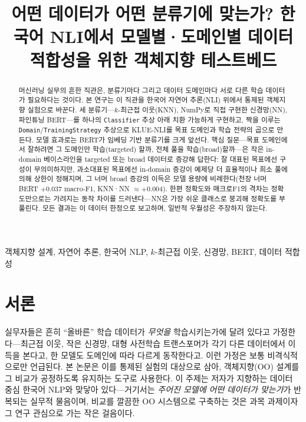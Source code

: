 \documentclass[conference]{IEEEtran}
\begin{document}
\title{어떤 데이터가 어떤 분류기에 맞는가? 한국어 NLI에서 모델별·도메인별
데이터 적합성을 위한 객체지향 테스트베드}

\author{
}

\maketitle

\begin{abstract}
머신러닝 실무의 흔한 직관은, 분류기마다 그리고 데이터 도메인마다 서로
다른 학습 데이터가 필요하다는 것이다. 본 연구는 이 직관을 한국어 자연어
추론(NLI) 위에서 통제된 객체지향 실험으로 바꾼다. 세 분류기---$k$-최근접
이웃(KNN), NumPy로 직접 구현한 신경망(NN), 파인튜닝 BERT---를 하나의
\texttt{Classifier} 추상 아래 치환 가능하게 구현하고, 짝을 이루는
\texttt{Domain}/\texttt{TrainingStrategy} 추상으로 KLUE-NLI를 목표 도메인과
학습 전략의 곱으로 만든다. 모델 효과로는 BERT가 임베딩 기반 분류기를 크게
앞선다. 핵심 질문---목표 도메인에서 잘하려면 그 도메인만 학습(targeted)
할까, 전체 풀을 학습(broad)할까---은 작은 in-domain 베이스라인을 targeted
또는 broad 데이터로 증강해 답한다: 잘 대표된 목표에선 구성이 무의미하지만,
과소대표된 목표에선 in-domain 증강이 예제당 더 효율적이나 희소 풀에 의해 상한이
정해지며, 그 너머 broad 증강의 이득은 모델 용량에 비례한다(천장 너머 BERT $+0.037$
macro-F1, KNN·NN $\approx +0.004$). 한편 정확도와 매크로F1의 격차는 정확도만으로는
가려지는 동작 차이를 드러낸다---NN은 가장 쉬운 클래스로 붕괴해 정확도를
부풀린다. 모든 결과는 이 데이터 한정으로 보고하며, 일반적 우월성은
주장하지 않는다.
\end{abstract}

\begin{IEEEkeywords}
객체지향 설계, 자연어 추론, 한국어 NLP, $k$-최근접 이웃, 신경망, BERT,
데이터 적합성
\end{IEEEkeywords}

\section{서론}
\label{sec:intro}
실무자들은 흔히 ``올바른'' 학습 데이터가 \emph{무엇을} 학습시키는가에 달려
있다고 가정한다---최근접 이웃, 작은 신경망, 대형 사전학습 트랜스포머가 각기
다른 데이터에서 이득을 본다고, 한 모델도 도메인에 따라 다르게 동작한다고.
이런 가정은 보통 비격식적으로만 언급된다. 본 논문은 이를 통제된 실험의
대상으로 삼아, 객체지향(OO) 설계를 그 비교가 공정하도록 유지하는 도구로
사용한다. 이 주제는 저자가 지향하는 데이터 중심 한국어 NLP와 맞닿아
있다---거기서는 \emph{주어진 모델에 어떤 데이터가 맞는가}가 반복되는 실무적
물음이며, 비교를 깔끔한 OO 시스템으로 구축하는 것은 과목 과제이자 그 연구
관심으로 가는 작은 걸음이다.
\end{document}
